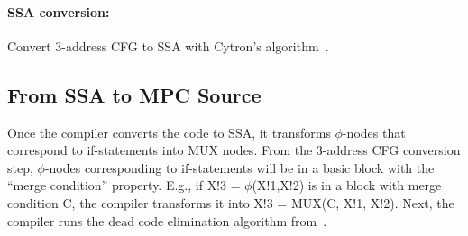         \squeeze
        \squeeze
        \paragraph{SSA conversion:}
        Convert 3-address CFG to SSA with Cytron's algorithm~\cite{Cytron:1991}.

\subsection{From SSA to MPC Source} %
\label{sec:ssa_to_MPC_Source}

Once the compiler converts the code to SSA,
it transforms $\phi$-nodes that correspond to if-statements into MUX nodes.
From the 3-address CFG conversion step,
$\phi$-nodes corresponding to if-statements will be in a basic block
with the ``merge condition'' property.
E.g., if {\sf X!3 = $\phi$(X!1,X!2)} is in a block with merge condition {\sf C},
the compiler transforms it into {\sf X!3 = MUX(C, X!1, X!2)}.
Next, the compiler runs the dead code elimination algorithm from~\cite{Cytron:1991}. %

